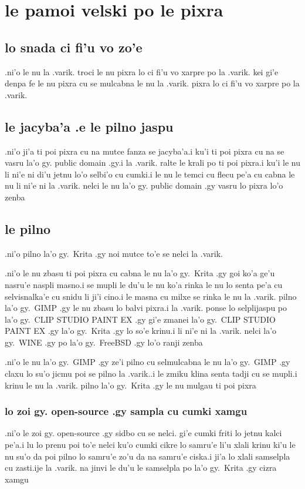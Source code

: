 \documentclass{report}
\begin{document}
\section{le pamoi velski po le pixra}
\subsection{lo snada ci fi'u vo zo'e}
.ni'o le nu la .varik. troci le nu pixra lo ci fi'u vo xarpre po la .varik. kei gi'e denpa fe le nu pixra cu se mulcabna le nu la .varik. pixra lo ci fi'u vo xarpre po la .varik.
\subsection{le jacyba'a .e le pilno jaspu}
.ni'o ji'a ti poi pixra cu na mutce fanza se jacyba'a\@  .i ku'i ti poi pixra cu na se vasru la'o gy. public domain .gy\@  .i la .varik. ralte le krali po ti poi pixra\@  .i ku'i le nu li ni'e ni di'u jetnu lo'o selbi'o cu cumki\@  .i le nu le temci cu flecu pe'a cu cabna le nu li ni'e ni la .varik. nelci le nu la'o gy. public domain .gy vasru lo pixra lo'o zenba

\subsection{le pilno}
.ni'o pilno la'o gy.\ Krita .gy noi mutce to'e se nelci la .varik.

.ni'o le nu zbasu ti poi pixra cu cabna le nu la'o gy.\ Krita .gy goi ko'a ge'u nasru'e naspli masno\@  .i se mupli le du'u le nu ko'a rinka le nu lo senta pe'a cu selvisnalka'e cu snidu li ji'i cino\@  .i le masna cu milxe se rinka le nu la .varik. pilno la'o gy.\ GIMP .gy le nu zbasu lo balvi pixra\@  .i la .varik. ponse lo selplijaspu po la'o gy.\ CLIP STUDIO PAINT EX .gy gi'e zmanei la'o gy.\ CLIP STUDIO PAINT EX .gy la'o gy.\ Krita .gy lo so'e krinu\@  .i li ni'e ni la .varik. nelci la'o gy.\ WINE .gy po la'o gy.\ FreeBSD .gy lo'o ranji zenba

.ni'o le nu la'o gy.\ GIMP .gy ze'i pilno cu selmulcabna le nu la'o gy.\ GIMP .gy claxu lo su'o jicmu poi se pilno la .varik.\@  .i le zmiku klina senta tadji cu se mupli\@  .i krinu le nu la .varik. pilno la'o gy.\ Krita .gy le nu mulgau ti poi pixra

\subsubsection{lo zoi gy. open-source .gy sampla cu cumki xamgu}
.ni'o le zoi gy. open-source .gy sidbo cu se nelci. gi'e cumki friti lo jetnu kalci pe'a\@\@  .i lu lo prenu poi to'e nelci ku'o cumki cikre lo samru'e li'u xlali krinu ki'u le nu su'o da poi pilno lo samru'e zo'u da na samru'e ciska\@\@  .i ji'a lo xlali samselpla cu zasti\@  .ije la .varik. na jinvi le du'u le samselpla po la'o gy.\ Krita .gy cizra xamgu
\end{document}
